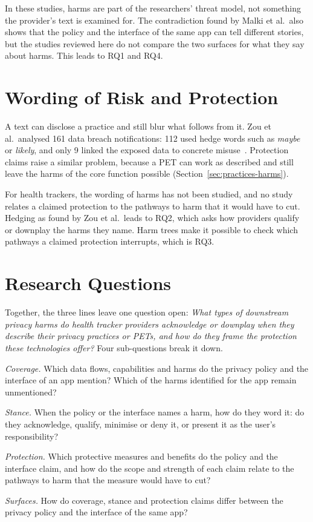 In these studies, harms are part of the researchers' threat model, not
something the provider's text is examined for. The contradiction found by
Malki et al.\ also shows that the policy and the interface of the same app can
tell different stories, but the studies reviewed here do not compare the two
surfaces for what they say about harms. This leads to RQ1 and RQ4.

\section{Wording of Risk and Protection}
\label{sec:rw-wording}
A text can disclose a practice and still blur what follows from it. Zou et
al.\ analysed 161 data breach notifications: 112 used hedge words such as
\emph{maybe} or \emph{likely}, and only 9 linked the exposed data to concrete
misuse~\parencite[\S5]{zou2019might}. Protection claims raise a similar
problem, because a PET can work as described and still leave the harms of the
core function possible (Section~\ref{sec:practices-harms}).

For health trackers, the wording of harms has not been studied, and no study
relates a claimed protection to the pathways to harm that it would have to
cut. Hedging as found by Zou et al.\ leads to RQ2, which asks how providers
qualify or downplay the harms they name. Harm trees make it possible to check
which pathways a claimed protection interrupts, which is RQ3.

\section{Research Questions}
\label{sec:rqs}
Together, the three lines leave one question open: \emph{What types of
downstream privacy harms do health tracker providers acknowledge or downplay
when they describe their privacy practices or PETs, and how do they frame the
protection these technologies offer?} Four sub-questions break it down.

\begin{description}[leftmargin=1.5em,itemsep=1pt,topsep=3pt,
                    labelindent=0pt,font=\normalfont\bfseries]
  \item[RQ1] \textit{Coverage.} Which data flows, capabilities and harms do the
    privacy policy and the interface of an app mention? Which of the harms
    identified for the app remain unmentioned?
  \item[RQ2] \textit{Stance.} When the policy or the interface names a harm, how
    do they word it: do they acknowledge, qualify, minimise or deny it, or
    present it as the user's responsibility?
  \item[RQ3] \textit{Protection.} Which protective measures and benefits do the
    policy and the interface claim, and how do the scope and strength of each
    claim relate to the pathways to harm that the measure would have to cut?
  \item[RQ4] \textit{Surfaces.} How do coverage, stance and protection claims
    differ between the privacy policy and the interface of the same app?
\end{description}
